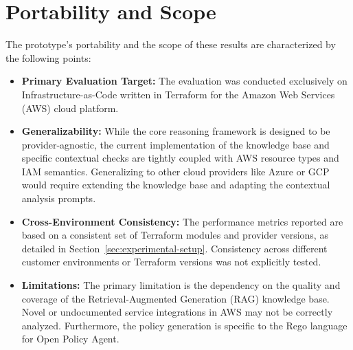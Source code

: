 \section{Portability and Scope}\label{sec:results-portability}

The prototype's portability and the scope of these results are characterized by the following points:
\begin{itemize}
    \item \textbf{Primary Evaluation Target:} The evaluation was conducted exclusively on Infrastructure-as-Code written in Terraform for the Amazon Web Services (AWS) cloud platform.
    \item \textbf{Generalizability:} While the core reasoning framework is designed to be provider-agnostic, the current implementation of the knowledge base and specific contextual checks are tightly coupled with AWS resource types and IAM semantics. Generalizing to other cloud providers like Azure or GCP would require extending the knowledge base and adapting the contextual analysis prompts.
    \item \textbf{Cross-Environment Consistency:} The performance metrics reported are based on a consistent set of Terraform modules and provider versions, as detailed in Section~\ref{sec:experimental-setup}. Consistency across different customer environments or Terraform versions was not explicitly tested.
    \item \textbf{Limitations:} The primary limitation is the dependency on the quality and coverage of the Retrieval-Augmented Generation (RAG) knowledge base. Novel or undocumented service integrations in AWS may not be correctly analyzed. Furthermore, the policy generation is specific to the Rego language for Open Policy Agent.
\end{itemize}


